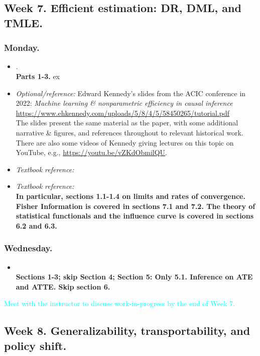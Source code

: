 \documentclass[letterpaper, 12pt, parskip=full,DIV=10]{scrartcl}
\begin{document}
\subsection*{Week 7. Efficient estimation: DR, DML, and TMLE.}

\subsubsection*{Monday.}
\begin{itemize}
\item {}. \\
\textbf{Parts 1-3.} ex
\item  \textit{Optional/reference:} Edward Kennedy's slides from the ACIC conference in 2022: \emph{Machine learning \& nonparametric efficiency
in causal inference} \url{https://www.ehkennedy.com/uploads/5/8/4/5/58450265/tutorial.pdf}\\
The slides present the same material as the paper, with some additional narrative \& figures, and references throughout to relevant historical work. There are also some videos of Kennedy giving lectures on this topic on YouTube, e.g., \url{https://youtu.be/vZKdObmilQU}.
\item  \textit{Textbook reference:} 
\item  \textit{Textbook reference:} \\
\textbf{In particular, sections 1.1-1.4 on limits and rates of convergence. Fisher Information is covered in sections 7.1 and 7.2. The theory of statistical functionals and the influence curve is covered in sections 6.2 and 6.3.}
\end{itemize}

\subsubsection*{Wednesday.}
\begin{itemize}
\item {} \\
\textbf{Sections 1-3; skip Section 4; Section 5: Only  5.1. Inference on ATE and ATTE. Skip section 6.}
\end{itemize}

\textcolor{cyan}{Meet with the instructor to discuss work-in-progress by the end of Week 7.}


\subsection*{Week 8. Generalizability, transportability, and policy shift.}
\end{document}
